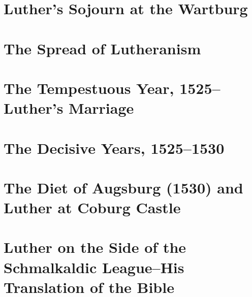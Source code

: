 \chapter{Luther’s Sojourn at the Wartburg}




\chapter{The Spread of Lutheranism}








\chapter{The Tempestuous Year, 1525--Luther’s Marriage}






\chapter{The Decisive Years, 1525--1530}









\chapter{The Diet of Augsburg (1530) and Luther at Coburg Castle}





\chapter{Luther on the Side of the Schmalkaldic League--His Translation of the Bible}





